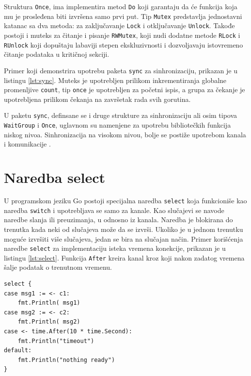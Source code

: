 \documentclass[12pt,oneside]{memoir}
\begin{document}
Struktura \texttt{Once}, ima implementira metod \texttt{Do} koji garantaju da će funkcija koja mu je prosleđena biti izvršena samo prvi put. Tip  \texttt{Mutex} predstavlja jednostavni katanac sa dva metoda: za zaključavanje \texttt{Lock} i otključavanje \texttt{Unlock}. Takođe postoji i muteks za čitanje i pisanje \texttt{RWMutex}, koji nudi dodatne metode \texttt{RLock} i \texttt{RUnlock} koji dopuštaju labaviji stepen ekskluzivnosti i dozvoljavaju istovremeno čitanje podataka u kritičnoj sekciji.

Primer koji demonstrira upotrebu paketa \texttt{sync} za sinhronizaciju, prikazan je u listingu \ref{lst:sync}. Muteks je upotrebljen prilikom inkrementiranja globalne promenljive \texttt{count}, tip \texttt{once} je upotrebljen za početni ispis, a grupa za čekanje je upotrebljena prilikom čekanja na završetak rada svih gorutina.

U paketu \texttt{sync}, definsane se i druge strukture za sinhronizaciju ali osim tipova \texttt{WaitGroup}  i \texttt{Once}, uglavnom su namenjene za upotrebu bibliotečkih funkcija niskog nivoa. Sinhronizacija na visokom nivou, bolje se postiže upotrebom kanala i komunikacije \cite{sync}. 

\section{Naredba select}

U programskom jeziku Go postoji specijalna naredba \texttt{select} koja funkcioniše kao naredba \texttt{switch} i upotrebljava se samo za kanale. Kao slučajevi se navode naredbe slanja ili preuzimanja, u odnosno iz kanala. Naredba je blokirana do trenutka kada neki od slučajeva može da se izvrši. Ukoliko je u jednom trenutku moguće izvršiti  više slučajeva, jedan se bira na slučajan način. Primer korišćenja naredbe \texttt{select} za implementaciju isteka vremena konekcije, prikazan je u listingu \ref{lst:select}. Funkcija \texttt{After} kreira kanal kroz koji nakon zadatog vremena šalje podatak o trenutnom vremenu.

\begin{center}
\begin{lstlisting}[caption=Primer upotrebe naredbe \texttt{select}, label={lst:select},  backgroundcolor=\color{background}]
select {
case msg1 := <- c1:
	fmt.Println( msg1)
case msg2 := <- c2:
	fmt.Println( msg2)
case <- time.After(10 * time.Second):
	fmt.Println("timeout")
default:
	fmt.Println("nothing ready")
}					
\end{lstlisting}
\end{center}
\end{document}
